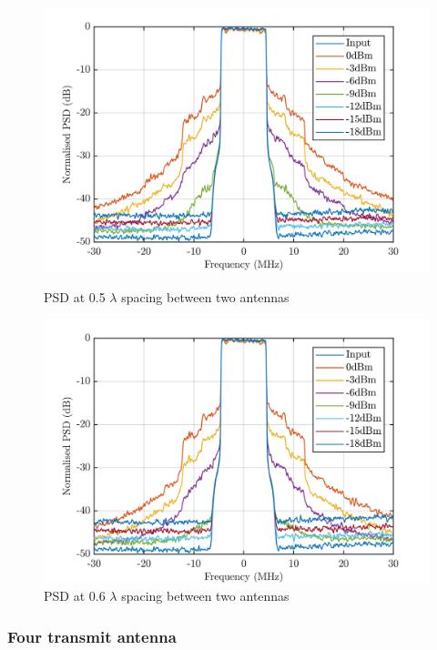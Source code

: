 \begin{figure}[H]
  \centering
  \begin{minipage}[b]{0.5\textwidth}
	\includegraphics[scale = 0.5]{figures/measurement/two_antenna/psd_05.png}
	\caption{PSD at 0.5 $\lambda$ spacing between two antennas}
    \label{fig:psd05}
  \end{minipage}
  \hfill
  \begin{minipage}[b]{0.4\textwidth}
\includegraphics[scale = 0.5]{figures/measurement/two_antenna/psd_06.png}
\caption{PSD at 0.6 $\lambda$ spacing between two antennas}
    \label{fig:psd06}
  \end{minipage}
\end{figure}

\subsubsection{Four transmit antenna}

